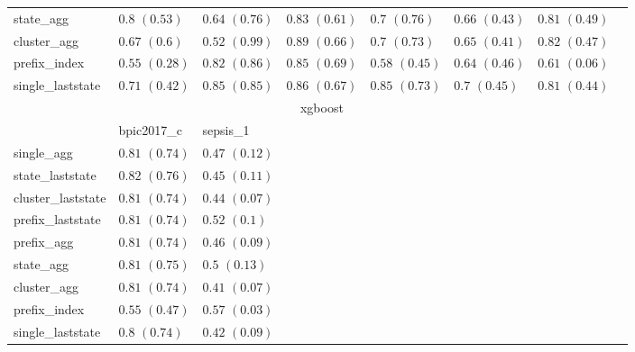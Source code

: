 \documentclass[twoside,11pt]{Latex/Classes/PhDthesisPSnPDF}
\begin{document}
\begin{table}[h]
{\begin{tabular}{llllllll}
		state\_agg & $0.8$ ${(0.53)}$ & $0.64$ ${(0.76)}$ & $0.83$ ${(0.61)}$ & $0.7$ ${(0.76)}$ & $0.66$ ${(0.43)}$ & $0.81$ ${(0.49)}$ \\
		cluster\_agg & $0.67$ ${(0.6)}$ & $0.52$ ${(0.99)}$ & $0.89$ ${(0.66)}$ & $0.7$ ${(0.73)}$ & $0.65$ ${(0.41)}$ & $\mathbf{0.82}$ $\mathbf{(0.47)}$  \\
		prefix\_index & $0.55$ ${(0.28)}$ & $0.82$ ${(0.86)}$ & $0.85$ ${(0.69)}$ & $0.58$ ${(0.45)}$ & $0.64$ ${(0.46)}$ & $0.61$ ${(0.06)}$ \\
		single\_laststate & $0.71$ ${(0.42)}$ & $0.85$ ${(0.85)}$ & $0.86$ ${(0.67)}$ & $\mathbf{0.85}$ $\mathbf{(0.73)}$  & $0.7$ ${(0.45)}$ & $0.81$ ${(0.44)}$ \\
		\bottomrule
		\toprule
		& \multicolumn{5}{c}{xgboost}
		\\
		& bpic2017\_c & sepsis\_1
		\\ \midrule
		single\_agg & $0.81$ ${(0.74)}$ & $0.47$ ${(0.12)}$ \\
		state\_laststate & $0.82$ ${(0.76)}$ & $0.45$ ${(0.11)}$ \\
		cluster\_laststate & $0.81$ ${(0.74)}$ & $0.44$ ${(0.07)}$ \\
		prefix\_laststate & $0.81$ ${(0.74)}$ & $0.52$ ${(0.1)}$ \\
		prefix\_agg & $0.81$ ${(0.74)}$ & $0.46$ ${(0.09)}$ \\
		state\_agg & $0.81$ ${(0.75)}$ & $0.5$ ${(0.13)}$ \\
		cluster\_agg & $0.81$ ${(0.74)}$ & $0.41$ ${(0.07)}$ \\
		prefix\_index & $0.55$ ${(0.47)}$ & $\mathbf{0.57}$ $\mathbf{(0.03)}$  \\
		single\_laststate & $0.8$ ${(0.74)}$ & $0.42$ ${(0.09)}$ \\
		\bottomrule
		
		\end{tabular}%
	}
\end{table}
\end{document}
